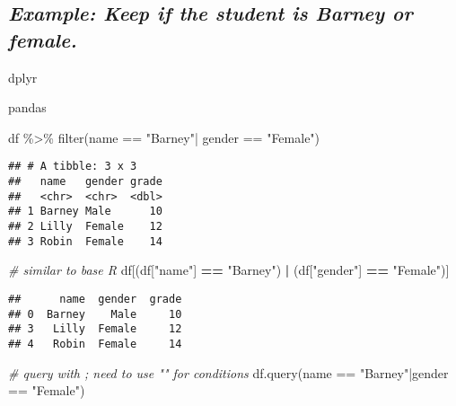 \documentclass[
]{book}
\newenvironment{Shaded}{\begin{snugshade}}{\end{snugshade}}
\newcommand{\CommentTok}[1]{\textcolor[rgb]{0.56,0.35,0.01}{\textit{#1}}}
\newcommand{\FunctionTok}[1]{\textcolor[rgb]{0.00,0.00,0.00}{#1}}
\newcommand{\NormalTok}[1]{#1}
\newcommand{\OperatorTok}[1]{\textcolor[rgb]{0.81,0.36,0.00}{\textbf{#1}}}
\newcommand{\SpecialCharTok}[1]{\textcolor[rgb]{0.00,0.00,0.00}{#1}}
\newcommand{\StringTok}[1]{\textcolor[rgb]{0.31,0.60,0.02}{#1}}
\begin{document}
\hypertarget{example-keep-if-the-student-is-barney-or-female.}{%
\subsection{\texorpdfstring{\emph{Example: Keep if the student is Barney or female.}}{Example: Keep if the student is Barney or female.}}\label{example-keep-if-the-student-is-barney-or-female.}}

dplyr

pandas

\begin{Shaded}
\begin{Highlighting}[]
\NormalTok{df }\SpecialCharTok{\%\textgreater{}\%} 
  \FunctionTok{filter}\NormalTok{(name }\SpecialCharTok{==} \StringTok{"Barney"}\SpecialCharTok{|}
\NormalTok{         gender }\SpecialCharTok{==} \StringTok{"Female"}\NormalTok{)}
\end{Highlighting}
\end{Shaded}

\begin{verbatim}
## # A tibble: 3 x 3
##   name   gender grade
##   <chr>  <chr>  <dbl>
## 1 Barney Male      10
## 2 Lilly  Female    12
## 3 Robin  Female    14
\end{verbatim}

\begin{Shaded}
\begin{Highlighting}[]
\CommentTok{\# similar to base R}
\NormalTok{df[(df[}\StringTok{"name"}\NormalTok{] }\OperatorTok{==} \StringTok{"Barney"}\NormalTok{) }\OperatorTok{|} 
\NormalTok{   (df[}\StringTok{"gender"}\NormalTok{] }\OperatorTok{==} \StringTok{"Female"}\NormalTok{)]}
\end{Highlighting}
\end{Shaded}

\begin{verbatim}
##      name  gender  grade
## 0  Barney    Male     10
## 3   Lilly  Female     12
## 4   Robin  Female     14
\end{verbatim}

\begin{Shaded}
\begin{Highlighting}[]
\CommentTok{\# query with \textquotesingle{}\textquotesingle{}; need to use "" for conditions}
\NormalTok{df.query(}\StringTok{\textquotesingle{}name == "Barney"|gender == "Female"\textquotesingle{}}\NormalTok{)}
\end{Highlighting}
\end{Shaded}
\end{document}
